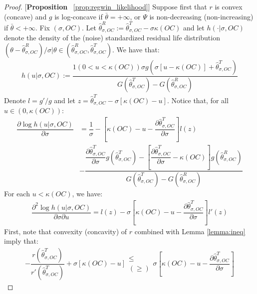 \begin{proof}{[\textbf{Proposition} ~\ref{prop:regwin_likelihood}]} Suppose first that $r$ is convex (concave) and $g$ is log-concave if $\bar{\theta}=+\infty$, or $\Psi$ is non-decreasing (non-increasing) if $\bar{\theta}<+\infty$. Fix $(\sigma,OC)$. Let $\hat{\theta}^R_{\sigma,OC} := \hat{\theta}^T_{\sigma,OC}-\sigma \kappa(OC)$ and let $h(\cdot|\sigma,OC)$ denote the density of the (noise) standardized residual life distribution $(\theta - \hat{\theta}^R_{\sigma,OC})/\sigma|\theta\in (\hat{\theta}^R_{\sigma,OC}, \hat{\theta}^T_{\sigma,OC})$. We have that:
\begin{align*}
    h(u|\sigma,OC) := \dfrac{1(0<u<\kappa(OC))\sigma g(\sigma[u-\kappa(OC)] + \hat{\theta}^T_{\sigma,OC})}{G(\hat{\theta}^T_{\sigma,OC}) - G(\hat{\theta}^R_{\sigma,OC})}
\end{align*}
Denote $l = g'/g$ and let $z = \hat{\theta}^T_{\sigma,OC} - \sigma[\kappa(OC)-u]$. Notice that, for all $u\in(0,\kappa(OC))$:
\begin{align*}
    \dfrac{\partial \log h(u|\sigma,OC)}{\partial \sigma} &= \dfrac{1}{\sigma} - \left[\kappa(OC)-u-\dfrac{\partial \hat{\theta}^T_{\sigma,OC}}{\partial \sigma}\right]l(z) \\ 
    &- \dfrac{\dfrac{\partial \hat{\theta}^T_{\sigma,OC}}{\partial \sigma}g(\hat{\theta}^T_{\sigma,OC}) - \left[\dfrac{\partial \hat{\theta}^T_{\sigma,OC}}{\partial \sigma} - \kappa(OC)\right]g(\hat{\theta}^R_{\sigma,OC})}{G(\hat{\theta}^T_{\sigma,OC}) - G(\hat{\theta}^R_{\sigma,OC})}
\end{align*}
For each $u<\kappa(OC)$, we have:
\begin{align}\label{eq:scorederiv}
    \dfrac{\partial^2 \log h(u|\sigma,OC)}{\partial \sigma \partial u} = l(z) - \sigma\left[\kappa(OC)-u-\dfrac{\partial \hat{\theta}^T_{\sigma,OC}}{\partial \sigma}\right]l'(z) 
\end{align}
First, note that convexity (concavity) of $r$ combined with Lemma \ref{lemma:ineq} imply that:
\begin{align}\label{eq:ineq2}
    -\dfrac{r(\hat{\theta}^T_{\sigma,OC})}{r'(\hat{\theta}^T_{\sigma,OC})} + \sigma[\kappa(OC)-u] \substack{\leq \\ (\geq)} \sigma\left[\kappa(OC)-u-\dfrac{\partial \hat{\theta}^T_{\sigma,OC}}{\partial \sigma}\right]
\end{align}



\end{proof}
